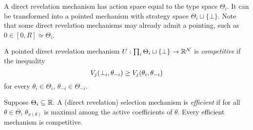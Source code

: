 \begin{example}

  A direct revelation mechanism has action space equal to the type space $\Theta_i$.
  It can be transformed into a pointed mechanism with strategy space $\Theta_i\sqcup\{\bot\}$.
  Note that some direct revelation mechanisms may already admit a pointing, such as $0\in [0,R]\simeq\Theta_i$.

\end{example}

\begin{definition}[Competitiveness]
  \label{def-competitive}

  A pointed direct revelation mechanism $U:\prod_i\Theta_i\sqcup\{\bot\}\rightarrow\mathbb{R}^{\mathcal{N}}$ is \emph{competitive} if the inequality
  \[
    V_j(\bot_i,\theta_{-i}) \geq V_j(\theta_i,\theta_{-i})
  \]
  for every $\theta_i\in\Theta_i$, $\theta_{-i}\in\Theta_{-i}$.

\end{definition}

Suppose $\Theta_i\subseteq\mathbb{R}$.
%
A (direct revelation) selection mechanism is \emph{efficient} if for all $\theta\in\overline{\Theta}$, $\theta_{x(\theta)}$ is maximal among the active coefficients of $\theta$.
%
Every efficient mechanism is competitive.

